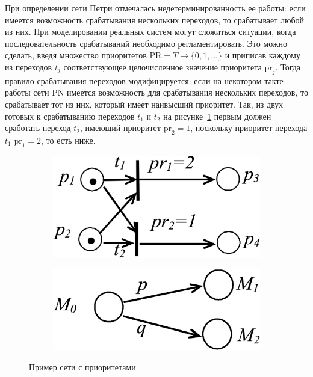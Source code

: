 При определении сети Петри отмечалась недетерминированность ее работы: если имеется возможность срабатывания нескольких переходов, то срабатывает любой из них. При моделировании реальных систем могут сложиться ситуации, когда последовательность срабатываний необходимо регламентировать. Это можно сделать, введя множество приоритетов ${\text{PR} = T\rightarrow \{ 0, 1, \dots \}}$ и приписав каждому из переходов $t_j$ соответствующее целочисленное значение приоритета $\text{pr}_j$. Тогда правило срабатывания переходов модифицируется: если на некотором такте работы сети PN имеется возможность для срабатывания нескольких переходов, то срабатывает тот из них, который имеет наивысший приоритет. Так, из двух готовых к срабатыванию переходов $t_1$ и $t_2$ на рисунке~\ref{img:13/inc/pr1} первым должен сработать переход $t_2$, имеющий приоритет ${\text{pr}_2 = 1}$, поскольку приоритет перехода $t_1$ ${\text{pr}_1 = 2}$, то есть ниже.

\begin{figure}[!htb]
    \centering
    \begin{subfigure}{0.45\textwidth}
        \includegraphics[width=\textwidth]{13/inc/pr1}
        \caption{}
        \label{img:13/inc/pr1}
    \end{subfigure}
    \hspace{.5cm}
    \begin{subfigure}{0.45\textwidth}
        \includegraphics[width=\textwidth]{13/inc/pr2}
        \caption{}
        \label{img:13/inc/pr2}
    \end{subfigure}
    \caption{Пример сети с приоритетами}
\end{figure}

